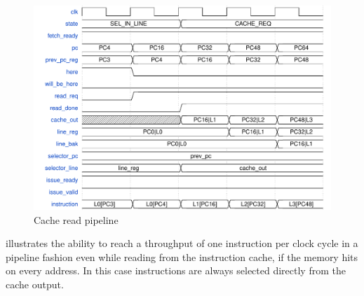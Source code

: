 \begin{figure}[!ht]
  \centering
  \includegraphics[width=\textwidth]{img/fetch07.pdf}
  \caption{Cache read pipeline}
  \label{fig:fetch07}
\end{figure}
 illustrates the ability to reach a throughput of one instruction per clock cycle in a pipeline fashion even while reading from the instruction cache, if the memory hits on every address. In this case instructions are always selected directly from the cache output.

